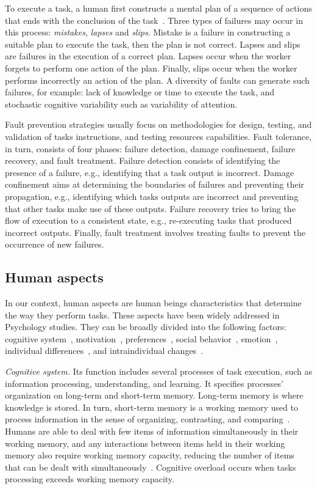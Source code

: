\documentclass[11pt]{bmc_article_s50}
\begin{document}
To execute a task, a human first constructs a mental plan of a sequence of actions that ends with the conclusion of the task~\cite{James:HumanError:1990}. Three types of failures may occur in this process: \textit{mistakes}, \textit{lapses} and \textit{slips}. Mistake is a failure in constructing a suitable plan to execute the task, then the plan is not correct. Lapses and slips are failures in the execution of a correct plan. Lapses occur when the worker forgets to perform one action of the plan. Finally, slips occur when the worker performs incorrectly an action of the plan. A diversity of faults can generate such failures, for example: lack of knowledge or time to execute the task, and stochastic cognitive variability such as variability of attention.

Fault prevention strategies usually focus on methodologies for design, testing, and validation of tasks instructions, and testing resources capabilities. Fault tolerance, in turn, consists of four phases: failure detection, damage confinement, failure recovery, and fault treatment. Failure detection consists of identifying the presence of a failure, e.g., identifying that a task output is incorrect. Damage confinement aims at determining the boundaries of failures and preventing their propagation, e.g., identifying which tasks outputs are incorrect and preventing that other tasks make use of these outputs. Failure recovery tries to bring the flow of execution to a consistent state, e.g., re-executing tasks that produced incorrect outputs. Finally, fault treatment involves treating faults to prevent the occurrence of new failures.

\subsection{Human aspects}

In our context, human aspects are human beings characteristics that determine the way they perform tasks. These aspects have been widely addressed in Psychology studies. They can be broadly divided into the following factors: cognitive system~\cite{Simon:1990,Sweller:1998}, motivation~\cite{Maslow:1943}, preferences~\cite{Kapteyn:1978}, social behavior~\cite{Alexander:1974}, emotion~\cite{Gross:1998,Dolan:2002}, individual differences~\cite{Parasuraman:2012,Stanovich:1998}, and intraindividual changes~\cite{Ram:2005}.

\textit{Cognitive system.} Its function includes several processes of task execution, such as information processing, understanding, and learning. It specifies processes' organization on long-term and short-term memory. Long-term memory is where knowledge is stored. In turn, short-term memory is a working memory used to process information in the sense of organizing, contrasting, and comparing~\cite{Simon:1990}. Humans are able to deal with few items of information simultaneously in their working memory, and any interactions between items held in their working memory also require working memory capacity, reducing the number of items that can be dealt with simultaneously~\cite{Sweller:1998}. Cognitive overload occurs when tasks processing exceeds working memory capacity.
\end{document}
